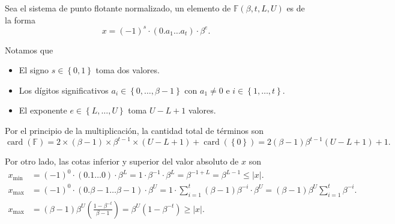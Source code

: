 \documentclass[
	spanish,
	8pt,
	utf8,
	xcolor=table,
	handout,
	aspectratio=169,
	professionalfonts,
	mathserif,
	leqno,
]{beamer}
\begin{document}
\begin{frame}
	\begin{solution}
		Sea el sistema de punto flotante normalizado, un elemento de
		$\mathbb{F}\left(\beta, t, L, U\right)$ es de la forma
		\begin{equation*}
			x=
			{\left(-1\right)}^{s}\cdot
			\left(0.a_{1}\ldots a_{t}\right)\cdot
			{\beta}^{e}.
		\end{equation*}

		Notamos que

		\begin{itemize}
			\item

			      El signo $s\in\left\{0,1\right\}$ toma dos valores.

			\item

			      Los dígitos significativos
			      $a_{i}\in\left\{0,\ldots,\beta-1\right\}$ con
			      $a_{1}\neq 0$ e $i\in\left\{1,\ldots,t\right\}$.

			\item

			      El exponente $e\in\left\{L,\ldots,U\right\}$ toma $U-L+1$ valores.
		\end{itemize}

		Por el principio de la multiplicación, la cantidad total de
		términos son
		\begin{equation*}
			\operatorname{card}\left(\mathbb{F}\right)=
			2\times
			\left(\beta-1\right)\times
			\beta^{t-1}\times
			\left(U-L+1\right)+
			\operatorname{card}\left(\left\{0\right\}\right)=
			2\left(\beta-1\right)\beta^{t-1}\left(U-L+1\right)+
			1.
		\end{equation*}

		Por otro lado, las cotas inferior y superior del valor absoluto
		de $x$ son
		\begin{align*}
			x_{\min} & =
			{\left(-1\right)}^{0}\cdot
			\left(0.1\ldots 0\right)\cdot
			{\beta}^{L}=
			1\cdot
			{\beta}^{-1}\cdot
			{\beta}^{L}=
			{\beta}^{-1+L}=
			\beta^{L-1}\leq
			\left|x\right|. \\
			x_{\max} & =
			{\left(-1\right)}^{0}\cdot
			\left(0.\beta-1\ldots \beta-1\right)\cdot
			{\beta}^{U}=
			1\cdot
			\sum_{i=1}^{t}
			\left(\beta-1\right)
			\beta^{-i}\cdot
			{\beta}^{U}=
			\left(\beta-1\right)
			{\beta}^{U}
			\sum_{i=1}^{t}
			\beta^{-i}.     \\
			x_{\max} & =
			\left(\beta-1\right)
			{\beta}^{U}
			\left(\frac{1-\beta^{-t}}{\beta-1}\right)
			=\beta^{U}\left(1-\beta^{-t}\right)\geq
			\left|x\right|.
		\end{align*}
	\end{solution}
\end{frame}
\end{document}
